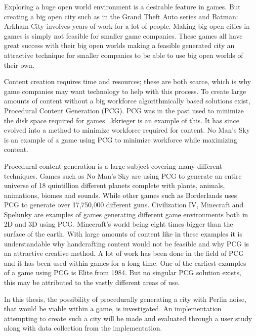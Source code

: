Exploring a huge open world environment is a desirable feature in games. But creating a big open city such as in the Grand Theft Auto\cite{GTA} series and Batman: Arkham City\cite{Batman} involves years of work for a lot of people. Making big open cities in games is simply not feasible for smaller game companies. These games all have great success with their big open worlds making a feasible generated city an attractive technique for smaller companies to be able to use big open worlds of their own.
\par
Content creation requires time and resources; these are both scarce, which is why game companies may want technology to help with this process. To create large amounts of content without a big workforce algorithmically based solutions exist, Procedural Content Generation (PCG). PCG was in the past used to minimize the disk space required for games. .kkrieger\cite{Kkrieger} is an  example of this. It has since evolved into a method to minimize workforce required for content. No Man's Sky\cite{NoMansSky} is an example of a game using PCG to minimize workforce while maximizing content.
\par
Procedural content generation is a large subject covering many different techniques. Games such as No Man's Sky\cite{NoMansSky} are using PCG to generate an entire universe of 18 quintillion\cite{NoMansSkyplanets} different planets complete with plants, animals, animations, biomes and sounds. While other games such as Borderlands\cite{Borderlands} uses PCG to generate over 17,750,000 different guns\cite{BorderlandsWeapons}. Civilization IV\cite{CivilizationCompany}, Minecraft\cite{Minecraft} and Spelunky\cite{Spelunky} are examples of games generating different game environments both in 2D and 3D using PCG. Minecraft's world being eight times bigger than the surface of the earth\cite{MinecraftSize}. With large amounts of content like in these examples it is understandable why handcrafting content would not be feasible and why PCG is an attractive creative method. A lot of work has been done in the field of PCG and it has been used within games for a long time. One of the earliest examples of a game using PCG is Elite\cite{Elite} from 1984. But no singular PCG solution exists, this may be attributed to the vastly different areas of use.
\par
In this thesis, the possibility of procedurally generating a city with Perlin noise, that would be viable within a game, is investigated. An implementation attempting to create such a city will be made and evaluated through a user study along with data collection from the implementation.
	
